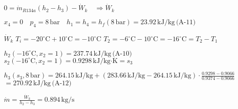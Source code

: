 \( 0 = \dot{m}_{R134a} (h_2 - h_3) - \dot{W}_k \quad \Rightarrow \dot{W}_k \)  

\( x_4 = 0 \quad p_4 = 8 \, \text{bar} \quad h_1 = h_4 = h_f(8 \, \text{bar}) = 23.92 \, \text{kJ/kg} \, \text{(A-11)} \)  

\( \dot{W}_k \)  
\( T_i = -20^\circ \text{C} + 10^\circ \text{C} = -10^\circ \text{C} \)  
\( T_2 = -6^\circ \text{C} - 10^\circ \text{C} = -16^\circ \text{C} = T_2 - T_1 \)  

\( h_2(-16^\circ \text{C}, x_2 = 1) = 237.74 \, \text{kJ/kg} \, \text{(A-10)} \)  
\( s_2(-16^\circ \text{C}, x_2 = 1) = 0.9298 \, \text{kJ/kg·K} = s_3 \)  

\( h_3(s_3, 8 \, \text{bar}) = 264.15 \, \text{kJ/kg} + (283.66 \, \text{kJ/kg} - 264.15 \, \text{kJ/kg}) \cdot \frac{0.9298 - 0.9066}{0.9374 - 0.9066} \)  
\( = 270.92 \, \text{kJ/kg} \, \text{(A-12)} \)  

\( \dot{m} = \frac{\dot{W}_k}{h_2 - h_3} = 0.894 \, \text{kg/s} \)
